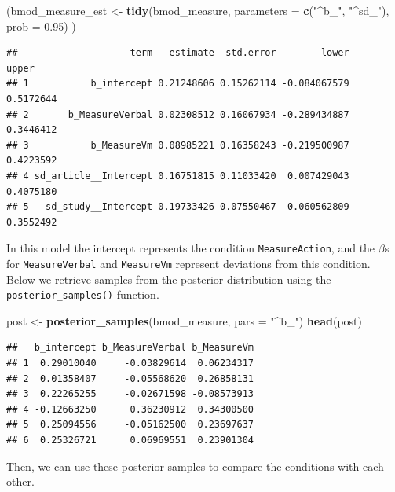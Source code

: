 \documentclass[floatsintext,doc]{apa6}
\newenvironment{Shaded}{\begin{snugshade}}{\end{snugshade}}
\newcommand{\DataTypeTok}[1]{\textcolor[rgb]{0.13,0.29,0.53}{#1}}
\newcommand{\FloatTok}[1]{\textcolor[rgb]{0.00,0.00,0.81}{#1}}
\newcommand{\KeywordTok}[1]{\textcolor[rgb]{0.13,0.29,0.53}{\textbf{#1}}}
\newcommand{\NormalTok}[1]{#1}
\newcommand{\StringTok}[1]{\textcolor[rgb]{0.31,0.60,0.02}{#1}}
\begin{document}
\begin{Shaded}
\begin{Highlighting}[]
\NormalTok{(bmod_measure_est <-}\StringTok{ }\KeywordTok{tidy}\NormalTok{(bmod_measure, }\DataTypeTok{parameters =} \KeywordTok{c}\NormalTok{(}\StringTok{"^b_"}\NormalTok{, }\StringTok{"^sd_"}\NormalTok{), }\DataTypeTok{prob =} \FloatTok{0.95}\NormalTok{) )}
\end{Highlighting}
\end{Shaded}

\begin{verbatim}
##                    term   estimate  std.error        lower     upper
## 1           b_intercept 0.21248606 0.15262114 -0.084067579 0.5172644
## 2       b_MeasureVerbal 0.02308512 0.16067934 -0.289434887 0.3446412
## 3           b_MeasureVm 0.08985221 0.16358243 -0.219500987 0.4223592
## 4 sd_article__Intercept 0.16751815 0.11033420  0.007429043 0.4075180
## 5   sd_study__Intercept 0.19733426 0.07550467  0.060562809 0.3552492
\end{verbatim}

In this model the intercept represents the condition \texttt{MeasureAction}, and the \(\beta\)s for \texttt{MeasureVerbal} and \texttt{MeasureVm} represent deviations from this condition. Below we retrieve samples from the posterior distribution using the \texttt{posterior\_samples()} function.

\begin{Shaded}
\begin{Highlighting}[]
\NormalTok{post <-}\StringTok{ }\KeywordTok{posterior_samples}\NormalTok{(bmod_measure, }\DataTypeTok{pars =} \StringTok{"^b_"}\NormalTok{)}
\KeywordTok{head}\NormalTok{(post)}
\end{Highlighting}
\end{Shaded}

\begin{verbatim}
##   b_intercept b_MeasureVerbal b_MeasureVm
## 1  0.29010040     -0.03829614  0.06234317
## 2  0.01358407     -0.05568620  0.26858131
## 3  0.22265255     -0.02671598 -0.08573913
## 4 -0.12663250      0.36230912  0.34300500
## 5  0.25094556     -0.05162500  0.23697637
## 6  0.25326721      0.06969551  0.23901304
\end{verbatim}

Then, we can use these posterior samples to compare the conditions with each other.
\end{document}

